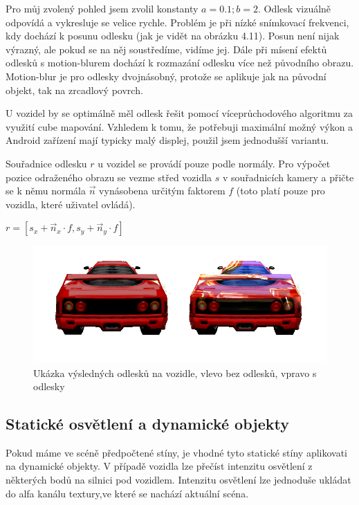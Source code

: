 \documentclass[11pt,twoside,a4paper]{book}
\begin{document}
Pro můj zvolený pohled jsem zvolil konstanty $a = 0.1; b = 2$. Odlesk vizuálně odpovídá a vykresluje se velice rychle. Problém je při nízké snímkovací frekvenci, kdy dochází k posunu odlesku (jak je vidět na obrázku 4.11). Posun není nijak výrazný, ale pokud se na něj soustředíme, vidíme jej. Dále při mísení efektů odlesků s motion-blurem dochází k rozmazání odlesku více než původního obrazu. Motion-blur je pro odlesky dvojnásobný, protože se aplikuje jak na původní objekt, tak na zrcadlový povrch.
\bigskip

U vozidel by se optimálně měl odlesk řešit pomocí víceprůchodového algoritmu za využití cube mapování. Vzhledem k tomu, že potřebuji maximální možný výkon a Android zařízení mají typicky malý displej, použil jsem jednodušší variantu.

Souřadnice odlesku $r$ u vozidel se provádí pouze podle normály. Pro výpočet pozice odraženého obrazu se vezme střed vozidla $s$ v souřadnicích kamery a přičte se k němu normála $\vec{n}$ vynásobena určitým faktorem $f$ (toto platí pouze pro vozidla, které uživatel ovládá).
\begin{center}
$r = [s_x + \vec{n}_x \cdot f, s_y + \vec{n}_y \cdot f]$
\end{center}

\begin{center}
\begin{figure}[h!]
\includegraphics[width=130mm]{figures/reflect-car.png}
\caption{Ukázka výsledných odlesků na vozidle, vlevo bez odlesků, vpravo s odlesky}
\end{figure}
\end{center}

\subsection{Statické osvětlení a dynamické objekty}

Pokud máme ve scéně předpočtené stíny, je vhodné tyto statické stíny aplikovat\linebreak i na dynamické objekty. V případě vozidla lze přečíst intenzitu osvětlení z některých bodů na silnici pod vozidlem. Intenzitu osvětlení lze jednoduše ukládat do alfa kanálu textury,\linebreak ve které se nachází aktuální scéna.
\end{document}
